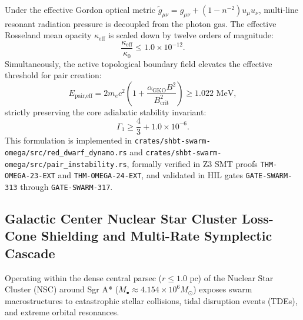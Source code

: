 \documentclass[11pt,onecolumn]{article}
\begin{document}
Under the effective Gordon optical metric $\tilde{g}_{\mu\nu} = g_{\mu\nu} + (1 - n^{-2}) u_\mu u_\nu$, multi-line resonant radiation pressure is decoupled from the photon gas. The effective Rosseland mean opacity $\kappa_{\text{eff}}$ is scaled down by twelve orders of magnitude:
\begin{equation}
\frac{\kappa_{\text{eff}}}{\kappa_0} \le 1.0 \times 10^{-12}.
\label{eq:gordon_opacity_quench_ratio}
\end{equation}
Simultaneously, the active topological boundary field elevates the effective threshold for pair creation:
\begin{equation}
E_{\text{pair,eff}} = 2 m_e c^2 \left(1 + \frac{\alpha_{\text{GKO}} B^2}{B_{\text{crit}}^2}\right) \ge 1.022\text{ MeV},
\label{eq:pair_threshold_elevation}
\end{equation}
strictly preserving the core adiabatic stability invariant:
\begin{equation}
\Gamma_1 \ge \frac{4}{3} + 1.0 \times 10^{-6}.
\label{eq:pair_adiabatic_clamp}
\end{equation}
This formulation is implemented in \texttt{crates/shbt-swarm-omega/src/red\_dwarf\_dynamo.rs} and \texttt{crates/shbt-swarm-omega/src/pair\_instability.rs}, formally verified in Z3 SMT proofs \texttt{THM-OMEGA-23-EXT} and \texttt{THM-OMEGA-24-EXT}, and validated in HIL gates \texttt{GATE-SWARM-313} through \texttt{GATE-SWARM-317}.

\subsection{Galactic Center Nuclear Star Cluster Loss-Cone Shielding and Multi-Rate Symplectic Cascade}
\label{subsec:nsc_losscone_multirate}
Operating within the dense central parsec ($r \le 1.0\text{ pc}$) of the Nuclear Star Cluster (NSC) around Sgr A* ($M_\bullet \approx 4.154 \times 10^6 M_\odot$) exposes swarm macrostructures to catastrophic stellar collisions, tidal disruption events (TDEs), and extreme orbital resonances.
\end{document}
